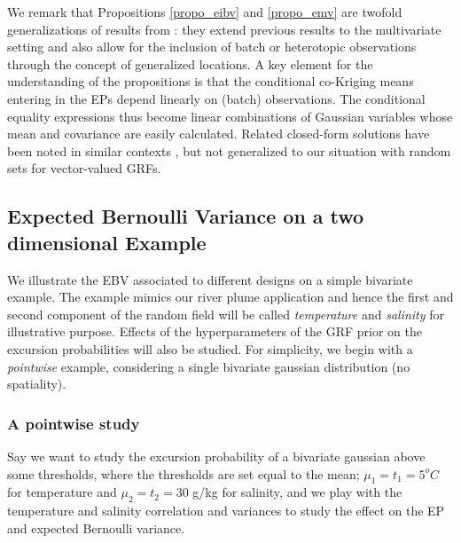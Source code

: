 \documentclass[aoas]{imsart}
\begin{document}
We remark that 
Propositions \ref{propo_eibv} and \ref{propo_emv} are twofold generalizations of  results from \cite{chevalier2014fast}: they extend previous results to the multivariate setting and also allow for the inclusion of batch or heterotopic observations through the concept of generalized locations. 
A key element for the understanding of the propositions is that the conditional co-Kriging means entering in the EPs depend linearly on (batch) observations. The conditional equality expressions thus become linear combinations of Gaussian variables whose mean and covariance are easily calculated. 
Related closed-form solutions have been noted in similar contexts \citep{bhattacharjya2013value,stroh}, but not generalized to our situation with
random sets for vector-valued GRFs.


\subsection{Expected Bernoulli Variance on a two dimensional Example}
\label{Sec:UnivarEx}

We illustrate the EBV associated to different designs on a simple bivariate example. The example mimics our river plume application and hence the first and second component of the random field will be called \textit{temperature} and \textit{salinity} for illustrative purpose. Effects of the hyperparameters of the GRF prior on the excursion probabilities will also be studied. For simplicity, we begin with a \textit{pointwise} example, considering a single bivariate gaussian distribution (no spatiality).

\subsubsection{A pointwise study}


Say we want to study the excursion probability of a bivariate gaussian above some thresholds, where the thresholds are set equal to the mean; $\mu_1=t_1=5^o C$ for temperature and  $\mu_2=t_2=30$ g/kg for salinity, and we play with the temperature and salinity correlation and variances to study the effect on the EP and expected Bernoulli variance.
\end{document}
